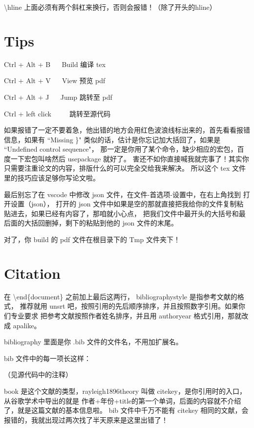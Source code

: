 \textbackslash hline 上面必须有两个斜杠来换行，否则会报错！（除了开头的hline）

\section{Tips}

Ctrl + Alt + B ~~ Build 编译 tex %

Ctrl + Alt + V ~~ View  预览 pdf

Ctrl + Alt + J ~~ Jump  跳转至 pdf

Ctrl + left click ~~~~ 跳转至源代码

如果报错了一定不要着急，他出错的地方会用红色波浪线标出来的，首先看看报错信息，如果有
``Missing \}" 类似的话，估计是你忘记加大括回了，如果是 ``Undefined control sequence"，
那一定是你用了某个命令，缺少相应的宏包，百度一下宏包叫啥然后 usepackage 就好了。
害还不如你直接喊我就完事了！其实你只需要注重论文的内容，排版什么的可以完全交给我来解决。
所以这个 tex 文件里的技巧应该足够你写论文啦。

最后别忘了在 vscode 中修改 json 文件，在文件-首选项-设置中，在右上角找到 打开设置（json），
打开的 json 文件中如果是空的那就直接把我给你的文件复制粘贴进去，如果已经有内容了，那咱就小心点，
把我们文件中最开头的大括号和最后面的大括回删掉，剩下的粘贴到他的 json 文件的末尾。

对了，你 build 的 pdf 文件在根目录下的 Tmp 文件夹下！

\section{Citation}
在 \textbackslash end\{document\} 之前加上最后这两行， bibliographystyle 是指参考文献的格式，
推荐就用 unsrt 吧，按照引用的先后顺序排序，并且按照数字引用。如果你们专业要求
把参考文献按照作者姓名排序，并且用 authoryear 格式引用，那就改成 apalike。

bibliography 里面是你 .bib 文件的文件名，不用加扩展名\cite{Garzone2002Interpretinginthe,Gentzler2017Translationandrewriting,JinYing2018JiaoTiChuan}。

bib 文件中的每一项长这样：

（见源代码中的注释）

book 是这个文献的类型，rayleigh1896theory 叫做 citekey，是你引用时的入口，从谷歌学术中导出的就是\cite{LiYaShu2017KeXueFan}
作者+年份+title的第一个单词，后面的内容就不介绍了，就是这篇文献的基本信息啦。
bib 文件中千万不能有 citekey 相同的文献，会报错的，我就出现过两次找了半天原来是这里出错了！

